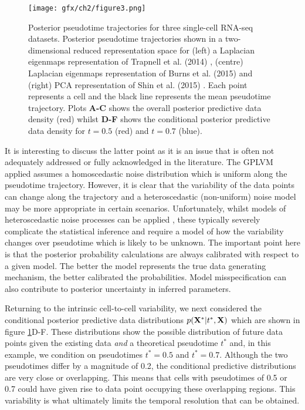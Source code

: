 \begin{figure}
\centering
	\texttt{[image: gfx/ch2/figure3.png]}
  	\caption[Posterior pseudotime trajectories for three single-cell RNA-seq datasets.]{Posterior pseudotime trajectories for three single-cell RNA-seq datasets. Posterior pseudotime trajectories shown in a two-dimensional reduced representation space for (left) a Laplacian eigenmaps representation of Trapnell et al. (2014) \cite{Trapnell2014-xi}, (centre) Laplacian eigenmaps representation of Burns et al. (2015) \cite{Burns2015} and (right) PCA representation of Shin et al. (2015) \cite{Shin2015}. Each point represents a cell and the black line represents the mean pseudotime trajectory. Plots \textbf{A-C} shows the overall posterior predictive data density (red) whilst \textbf{D-F} shows the conditional posterior predictive data density for $t = 0.5$ (red) and $t = 0.7$ (blue). }
  	\label{fig:posmean}
\end{figure}

It is interesting to discuss the latter point as it is an issue that is often not adequately addressed or fully acknowledged in the literature. The GPLVM applied assumes a homoscedastic noise distribution which is uniform along the pseudotime trajectory. However, it is clear that the variability of the data points can change along the trajectory and a heteroscedastic (non-uniform) noise model may be more appropriate in certain scenarios. Unfortunately, whilst models of heteroscedastic noise processes can be applied \cite{le2005heteroscedastic}, these typically severely complicate the statistical inference and require a model of how the variability changes over pseudotime which is likely to be unknown. The important point here is that the posterior probability calculations are always calibrated with respect to a given model. The better the model represents the true data generating mechanism, the better calibrated the probabilities. Model misspecification can also contribute to posterior uncertainty in inferred parameters.

Returning to the intrinsic cell-to-cell variability, we next considered the conditional posterior predictive data distributions $p({\bf X}^*|t^*, {\bf X})$ which are shown in figure \ref{fig:posmean}D-F. These distributions show the possible distribution of future data points given the existing data \emph{and} a theoretical pseudotime $t^*$ and, in this example, we condition on pseudotimes $t^* = 0.5$ and $t^* = 0.7$. Although the two pseudotimes differ by a magnitude of 0.2, the conditional predictive distributions are very close or overlapping. This means that cells with pseudotimes of 0.5 or 0.7 could have given rise to data point occupying these overlapping regions. This variability is what ultimately limits the temporal resolution that can be obtained.

